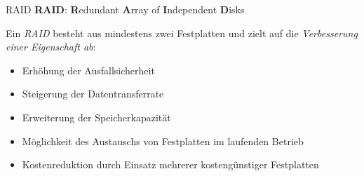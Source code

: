 \begin{defi}{RAID}
    \textbf{RAID}: \textbf{R}edundant \textbf{A}rray of \textbf{I}ndependent \textbf{D}isks

    Ein \emph{RAID} besteht aus mindestens zwei Festplatten und zielt auf die \emph{Verbesserung einer Eigenschaft ab}:
    \begin{itemize}
        \item Erhöhung der Ausfallsicherheit
        \item Steigerung der Datentransferrate
        \item Erweiterung der Speicherkapazität
        \item Möglichkeit des Austauschs von Festplatten im laufenden Betrieb
        \item Kostenreduktion durch Einsatz mehrerer kostengünstiger Festplatten
    \end{itemize}
\end{defi}


